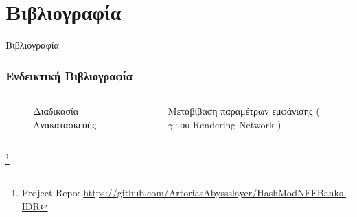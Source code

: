 \documentclass[10pt]{beamer}
\begin{document}
\section{Βιβλιογραφία}
\begin{frame}{Βιβλιογραφία}
\frametitle{Ενδεικτική Βιβλιογραφία}
\nocite{*}

%
\tiny{} 

\end{frame}
{
\begin{frame}
    \begin{columns}
        \begin{figure}
            \caption*{Διαδικασία Ανακατασκευής}
        \end{figure}
        \begin{figure}
            \caption*{Μεταβίβαση παραμέτρων εμφάνισης (\(\gamma\) του Rendering Network )}
        \end{figure}
    \end{columns}
    
     \let\thefootnote\relax\footnote{\tiny{Project Repo: \href{https://github.com/ArtoriasAbyssslayer/HashModNFFBanks-IDR}{https://github.com/ArtoriasAbyssslayer/HashModNFFBanks-IDR}}}
\end{frame}
\begin{frame}
\end{frame}}
\end{document}
